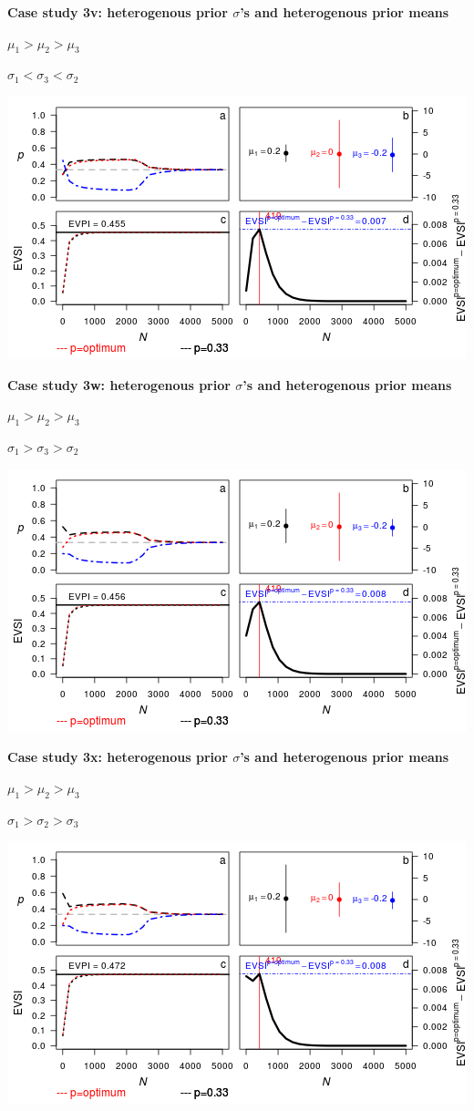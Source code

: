 \textbf{Case study 3v: heterogenous prior \(\sigma\)'s and heterogenous
prior means}

\(\mu_1 > \mu_2 > \mu_3\)

\(\sigma_1 < \sigma_3 < \sigma_2\)

\includegraphics{figure/x10n1_1___1__1c-1.png} \clearpage

\textbf{Case study 3w: heterogenous prior \(\sigma\)'s and heterogenous
prior means}

\(\mu_1 > \mu_2 > \mu_3\)

\(\sigma_1 > \sigma_3 > \sigma_2\)

\includegraphics{figure/x10n1__1___1_1c-1.png} \clearpage

\textbf{Case study 3x: heterogenous prior \(\sigma\)'s and heterogenous
prior means}

\(\mu_1 > \mu_2 > \mu_3\)

\(\sigma_1 > \sigma_2 > \sigma_3\)

\includegraphics{figure/x10n1___1__1_1c-1.png} \clearpage

\captionsetup{labelformat=default}
